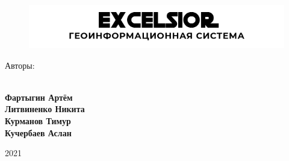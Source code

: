 
\newpage
\thispagestyle{empty}
\begin{figure}[!h]
	\centering
	\includegraphics[width=\linewidth, ]{./img/Hat.png}
\end{figure}
\vspace{13ex}
\begin{center}
	\vspace{13ex}
\end{center}
\vfill
\begin{flushleft}
	\noindent
	Авторы:
	
	\textbf{\small \\ Фартыгин Артём \\ Литвиненко Никита \\ Курманов Тимур \\ Кучербаев Аслан}
\end{flushleft}
\begin{center}
	2021
\end{center}
\newpage
